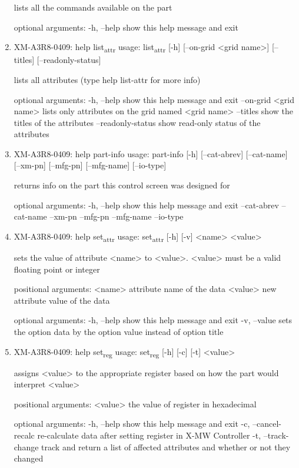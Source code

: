 \documentclass[11pt]{article}
\begin{document}
\begin{enumerate}
lists all the commands available on the part

optional arguments:
  -h, --help  show this help message and exit

\item XM-A3R8-0409: help list\textsubscript{attr}
\label{sec:org49ce025}
usage: list\textsubscript{attr} [-h] [--on-grid <grid name>] [--titles] [--readonly-status]

lists all attributes (type help list-attr for more info)

optional arguments:
  -h, --help            show this help message and exit
  --on-grid <grid name>
                        lists only attributes on the grid named <grid name>
  --titles              show the titles of the attributes
  --readonly-status     show read-only status of the attributes

\item XM-A3R8-0409: help part-info
\label{sec:orgf1671a2}
usage: part-info  [-h] [--cat-abrev] [--cat-name] [--xm-pn] [--mfg-pn] [--mfg-name]
        [--io-type]

returns info on the part this control screen was designed for

optional arguments:
  -h, --help   show this help message and exit
  --cat-abrev
  --cat-name
  --xm-pn
  --mfg-pn
  --mfg-name
  --io-type

\item XM-A3R8-0409: help set\textsubscript{attr}
\label{sec:org3b33531}
usage: set\textsubscript{attr} [-h] [-v] <name> <value>

sets the value of attribute <name> to <value>. <value> must be a valid
floating point or integer

positional arguments:
  <name>       attribute name of the data
  <value>      new attribute value of the data

optional arguments:
  -h, --help   show this help message and exit
  -v, --value  sets the option data by the option value instead of option
               title

\item XM-A3R8-0409: help set\textsubscript{reg}
\label{sec:org409bc2f}
usage: set\textsubscript{reg} [-h] [-c] [-t] <value>

assigns <value> to the appropriate register based on how the part would
interpret <value>

positional arguments:
  <value>              the value of register in hexadecimal

optional arguments:
  -h, --help           show this help message and exit
  -c, --cancel-recalc  re-calculate data after setting register in X-MW
                       Controller
  -t, --track-change   track and return a list of affected attributes and
                       whether or not they changed


\end{enumerate}
\end{document}
